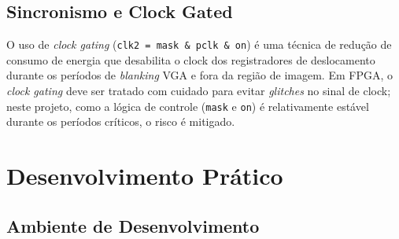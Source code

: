 \documentclass[12pt, a4paper]{article}
\begin{document}
	\subsection{Sincronismo e Clock Gated}
	
	O uso de \textit{clock gating} (\texttt{clk2 = mask \& pclk \& on}) é uma
	técnica de redução de consumo de energia que desabilita o clock dos
	registradores de deslocamento durante os períodos de \textit{blanking} VGA e
	fora da região de imagem. Em FPGA, o \textit{clock gating} deve ser tratado
	com cuidado para evitar \textit{glitches} no sinal de clock; neste projeto,
	como a lógica de controle (\texttt{mask} e \texttt{on}) é relativamente
	estável durante os períodos críticos, o risco é mitigado.
	
	\section{Desenvolvimento Prático}
	\label{sec:pratico}
	
	\subsection{Ambiente de Desenvolvimento}
	
\end{document}
